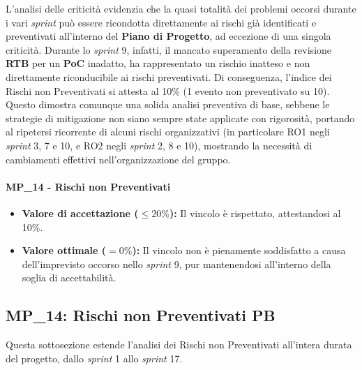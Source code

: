 \documentclass[12pt, a4paper]{article}
\begin{document}
L'analisi delle criticità evidenzia che la quasi totalità dei problemi occorsi durante i vari \textit{sprint} può essere ricondotta direttamente ai rischi già identificati e preventivati all'interno del \textbf{Piano di Progetto}, ad eccezione di una singola criticità. Durante lo \textit{sprint} 9, infatti, il mancato superamento della revisione \textbf{RTB} per un \textbf{PoC} inadatto, ha rappresentato un rischio inatteso e non direttamente riconducibile ai rischi preventivati. Di conseguenza, l'indice dei Rischi non Preventivati si attesta al 10\% (1 evento non preventivato su 10). Questo dimostra comunque una solida analisi preventiva di base, sebbene le strategie di mitigazione non siano sempre state applicate con rigorosità, portando al ripetersi ricorrente di alcuni rischi organizzativi (in particolare RO1 negli \textit{sprint} 3, 7 e 10, e RO2 negli \textit{sprint} 2, 8 e 10), mostrando la necessità di cambiamenti effettivi nell'organizzazione del gruppo.

\paragraph*{MP\_14 - Rischi non Preventivati}
\begin{itemize}
\item \textbf{Valore di accettazione ($\le 20\%$):} Il vincolo è rispettato, attestandosi al 10\%.
\item \textbf{Valore ottimale ($= 0\%$):} Il vincolo non è pienamente soddisfatto a causa dell'imprevisto occorso nello \textit{sprint} 9, pur mantenendosi all'interno della soglia di accettabilità.
\end{itemize}

\subsection{MP\_14: Rischi non Preventivati PB}
Questa sottosezione estende l'analisi dei Rischi non Preventivati all'intera durata del progetto, dallo \textit{sprint} 1 allo \textit{sprint} 17.
\end{document}
